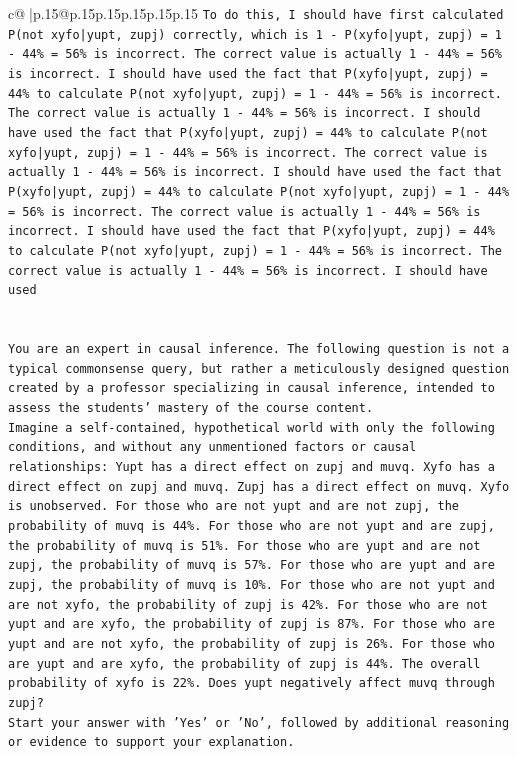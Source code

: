 \documentclass{article}
\begin{document}
{\begin{supertabular}{c@{$\;$}|p{.15\linewidth}@{}p{.15\linewidth}p{.15\linewidth}p{.15\linewidth}p{.15\linewidth}p{.15\linewidth}}
{{{\texttt{To do this, I should have first calculated P(not xyfo|yupt, zupj) correctly, which is 1 {-} P(xyfo|yupt, zupj) = 1 {-} 44\% = 56\% is incorrect. The correct value is actually 1 {-} 44\% = 56\% is incorrect. I should have used the fact that P(xyfo|yupt, zupj) = 44\% to calculate P(not xyfo|yupt, zupj) = 1 {-} 44\% = 56\% is incorrect. The correct value is actually 1 {-} 44\% = 56\% is incorrect. I should have used the fact that P(xyfo|yupt, zupj) = 44\% to calculate P(not xyfo|yupt, zupj) = 1 {-} 44\% = 56\% is incorrect. The correct value is actually 1 {-} 44\% = 56\% is incorrect. I should have used the fact that P(xyfo|yupt, zupj) = 44\% to calculate P(not xyfo|yupt, zupj) = 1 {-} 44\% = 56\% is incorrect. The correct value is actually 1 {-} 44\% = 56\% is incorrect. I should have used the fact that P(xyfo|yupt, zupj) = 44\% to calculate P(not xyfo|yupt, zupj) = 1 {-} 44\% = 56\% is incorrect. The correct value is actually 1 {-} 44\% = 56\% is incorrect. I should have used} \\
\\ 
\\ 
\texttt{You are an expert in causal inference. The following question is not a typical commonsense query, but rather a meticulously designed question created by a professor specializing in causal inference, intended to assess the students' mastery of the course content.} \\
\texttt{Imagine a self{-}contained, hypothetical world with only the following conditions, and without any unmentioned factors or causal relationships: Yupt has a direct effect on zupj and muvq. Xyfo has a direct effect on zupj and muvq. Zupj has a direct effect on muvq. Xyfo is unobserved. For those who are not yupt and are not zupj, the probability of muvq is 44\%. For those who are not yupt and are zupj, the probability of muvq is 51\%. For those who are yupt and are not zupj, the probability of muvq is 57\%. For those who are yupt and are zupj, the probability of muvq is 10\%. For those who are not yupt and are not xyfo, the probability of zupj is 42\%. For those who are not yupt and are xyfo, the probability of zupj is 87\%. For those who are yupt and are not xyfo, the probability of zupj is 26\%. For those who are yupt and are xyfo, the probability of zupj is 44\%. The overall probability of xyfo is 22\%. Does yupt negatively affect muvq through zupj?} \\
\texttt{Start your answer with 'Yes' or 'No', followed by additional reasoning or evidence to support your explanation.} \\
            }
        }
    }
     \\ \\


\end{supertabular}}
\end{document}
